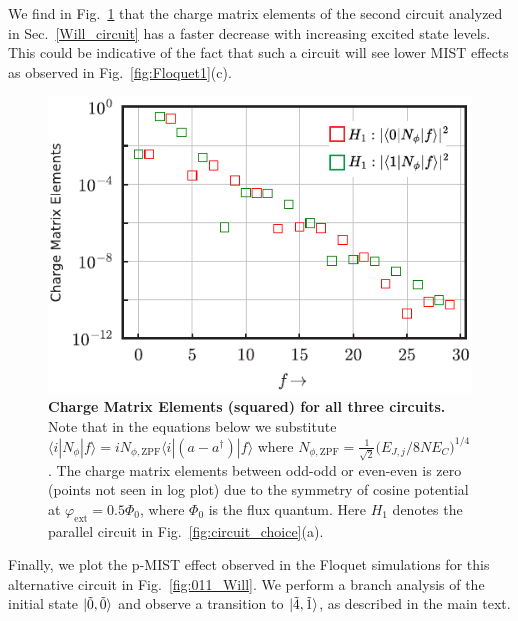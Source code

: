 \documentclass[%
reprint,
superscriptaddress,
 amsmath,amssymb,
 aps,
 prx,
longbibliography,
floatfix,
]{revtex4-2}
\begin{document}
We find in Fig.~\ref{fig:charge-matrix-Will} that the charge matrix elements of the second circuit analyzed in Sec.~\ref{Will_circuit} has a faster decrease with increasing excited state levels. This could be indicative of the fact that such a circuit will see lower MIST effects as observed in Fig.~\ref{fig:Floquet1}(c). 
\begin{figure}[htb]
    \centering
    \includegraphics[width=\linewidth]{Supp_Fig/Charge-matrix-Will.pdf}
    \caption{{\bf Charge Matrix 
 Elements (squared) for all three circuits.} Note that in the equations below we substitute $\langle i|N_\phi|f\rangle=iN_{\phi,\mathrm{ZPF}}\langle i|(a-a^\dagger)|f\rangle$ where $N_{\phi,\mathrm{ZPF}}=\frac{1}{\sqrt{2}}\Big(E_{J,j}/8NE_C\Big)^{1/4}$. The charge matrix elements between odd-odd or even-even is zero (points not seen in log plot) due to the symmetry of cosine potential at $\varphi_\mathrm{ext}=0.5\Phi_0$, where $\Phi_0$ is the flux quantum. Here $H_1$ denotes the parallel circuit in Fig.~\ref{fig:circuit_choice}(a).}
    \label{fig:charge-matrix-Will}
\end{figure}

Finally, we plot the p-MIST effect observed in the Floquet simulations for this alternative circuit in Fig.~\ref{fig:011_Will}. We perform a branch analysis of the initial state $\ket{\tilde{0}, \tilde{0}}$ and observe a transition to $\ket{\tilde{4},\tilde{1}}$, as described in the main text. 
\end{document}
